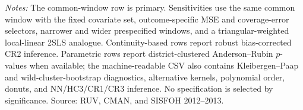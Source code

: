 \begin{minipage}{0.98\linewidth}\footnotesize\textit{Notes:} The common-window row is primary. Sensitivities use the same common window with the fixed covariate set, outcome-specific MSE and coverage-error selectors, narrower and wider prespecified windows, and a triangular-weighted local-linear 2SLS analogue. Continuity-based rows report robust bias-corrected CR2 inference. Parametric rows report district-clustered Anderson--Rubin \(p\)-values when available; the machine-readable CSV also contains Kleibergen--Paap and wild-cluster-bootstrap diagnostics, alternative kernels, polynomial order, donuts, and NN/HC3/CR1/CR3 inference. No specification is selected by significance. Source: RUV, CMAN, and SISFOH 2012--2013.\end{minipage}
\endgroup
